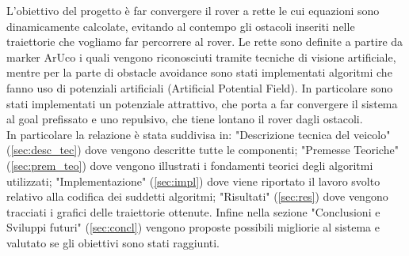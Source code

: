 L'obiettivo del progetto è far convergere il rover a rette le cui equazioni sono dinamicamente calcolate, evitando al contempo gli ostacoli inseriti nelle traiettorie che vogliamo far percorrere al rover.  Le rette sono definite a  partire da marker ArUco i quali vengono riconosciuti tramite tecniche di visione artificiale, mentre per la parte di obstacle avoidance sono stati implementati algoritmi che fanno uso di potenziali artificiali (Artificial Potential Field). In particolare sono stati implementati un potenziale attrattivo, che porta a far convergere il sistema al goal prefissato e uno repulsivo, che tiene lontano il rover dagli ostacoli.\\
In particolare la relazione è stata suddivisa in: "Descrizione tecnica del veicolo" (\autoref{sec:desc_tec}) dove vengono descritte tutte le componenti; "Premesse Teoriche" (\autoref{sec:prem_teo}) dove vengono illustrati i fondamenti teorici degli algoritmi utilizzati; "Implementazione" (\autoref{sec:impl}) dove viene riportato il lavoro svolto relativo alla codifica dei suddetti algoritmi; "Risultati" (\autoref{sec:res}) dove vengono tracciati i grafici delle traiettorie ottenute. Infine nella sezione "Conclusioni e Sviluppi futuri" (\autoref{sec:concl}) vengono proposte possibili migliorie al sistema e valutato se gli obiettivi sono stati raggiunti.
